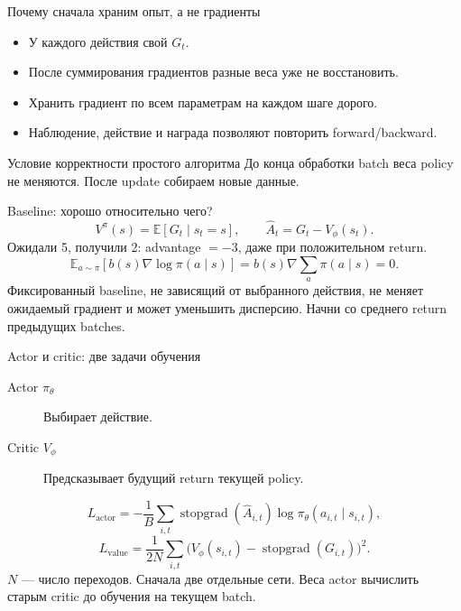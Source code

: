 \documentclass[aspectratio=169]{beamer}
\begin{document}
\begin{frame}{Почему сначала храним опыт, а не градиенты}
  \begin{itemize}
    \item У каждого действия свой $G_t$.
    \item После суммирования градиентов разные веса уже не восстановить.
    \item Хранить градиент по всем параметрам на каждом шаге дорого.
    \item Наблюдение, действие и награда позволяют повторить forward/backward.
  \end{itemize}
  \begin{block}{Условие корректности простого алгоритма}
    До конца обработки batch веса policy не меняются.
    После update собираем новые данные.
  \end{block}
\end{frame}

\begin{frame}{Baseline: хорошо относительно чего?}
  \[
    V^\pi(s)=\mathbb E[G_t\mid s_t=s],\qquad
    \widehat A_t=G_t-V_\phi(s_t).
  \]
  Ожидали 5, получили 2: advantage $=-3$, даже при положительном return.
  \[
    \mathbb E_{a\sim\pi}[b(s)\nabla\log\pi(a\mid s)]
    =b(s)\nabla\sum_a\pi(a\mid s)=0.
  \]
  Фиксированный baseline, не зависящий от выбранного действия,
  не меняет ожидаемый градиент и может уменьшить дисперсию.
  Начни со среднего return предыдущих batches.
\end{frame}

\begin{frame}{Actor и critic: две задачи обучения}
  \begin{description}
    \item[Actor $\pi_\theta$] Выбирает действие.
    \item[Critic $V_\phi$] Предсказывает будущий return текущей policy.
  \end{description}
  \[
    L_{\mathrm{actor}}=-\frac1B\sum_{i,t}
    \operatorname{stopgrad}(\widehat A_{i,t})\log\pi_\theta(a_{i,t}\mid s_{i,t}),
  \]
  \[
    L_{\mathrm{value}}=\frac{1}{2N}\sum_{i,t}
    \bigl(V_\phi(s_{i,t})-\operatorname{stopgrad}(G_{i,t})\bigr)^2.
  \]
  $N$ --- число переходов. Сначала две отдельные сети.
  Веса actor вычислить старым critic до обучения на текущем batch.
\end{frame}
\end{document}

